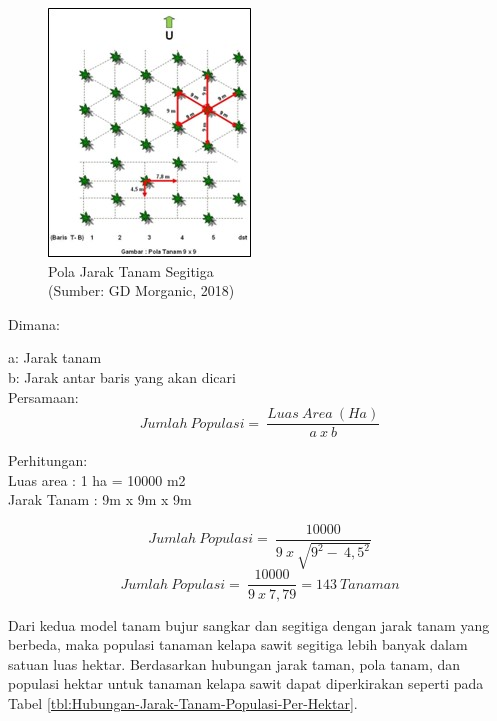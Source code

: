 \begin{enumerate}[label=(\alph*)]
\begin{enumerate}[label=(\alph*)]
\begin{enumerate}
			\begin{figure}[H]
				\vspace{-0.1cm}
				\begin{center}
					\includegraphics[width=0.4\columnwidth]{bab2/Gambar/Picture49.jpg}
				\end{center}
				\vspace{-0.2cm}
				\captionsetup{justification=centering}
				\caption{Pola Jarak Tanam Segitiga\\(Sumber: GD Morganic, 2018)}\label{img:Pola-Jarak-Tanam-Segitiga}
			\end{figure}
			Dimana: 
			
			a: Jarak tanam\\
			b: Jarak antar baris yang akan dicari \\
			
			Persamaan:
			\[ Jumlah\ Populasi=\ \frac{Luas\ Area\ (Ha)}{a\ x\ b} \]
			
			Perhitungan:\\
			Luas area	: 1 ha = 10000 m2\\
			Jarak Tanam	: 9m x 9m x 9m
			
			\[ Jumlah\ Populasi=\ \frac{10000}{9\ x\ \sqrt{9^2-\ {4,5}^2}} \]
			\[ Jumlah\ Populasi=\ \frac{10000}{9\ x\ 7,79}=143\ Tanaman \]
			
			Dari kedua model tanam bujur sangkar dan segitiga dengan jarak tanam yang berbeda, maka populasi tanaman kelapa sawit segitiga lebih banyak dalam satuan luas hektar. Berdasarkan hubungan jarak taman, pola tanam, dan populasi hektar untuk tanaman kelapa sawit dapat diperkirakan seperti pada Tabel \ref{tbl:Hubungan-Jarak-Tanam-Populasi-Per-Hektar}.
			

\end{enumerate}
\end{enumerate}
\end{enumerate}
